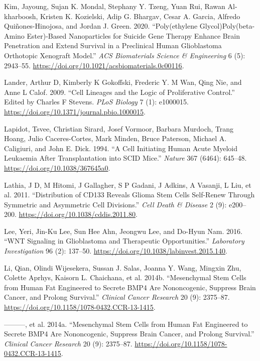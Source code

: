 \documentclass[
  letterpaper,
]{scrreprt}
\newlength{\cslhangindent}
\newenvironment{CSLReferences}[2] %
 {\begin{list}{}{%
  \setlength{\itemindent}{0pt}
  \setlength{\leftmargin}{0pt}
  \setlength{\parsep}{0pt}
  \ifodd #1
   \setlength{\leftmargin}{\cslhangindent}
   \setlength{\itemindent}{-1\cslhangindent}
  \fi
  \setlength{\itemsep}{#2\baselineskip}}}
 {\end{list}}
\theoremstyle{definition}
\theoremstyle{remark}
\begin{document}
\begin{CSLReferences}{1}{0}
Kim, Jayoung, Sujan K. Mondal, Stephany Y. Tzeng, Yuan Rui, Rawan
Al-kharboosh, Kristen K. Kozielski, Adip G. Bhargav, Cesar A. Garcia,
Alfredo Quiñones-Hinojosa, and Jordan J. Green. 2020. {``Poly(ethylene
Glycol){\textendash}Poly(beta-Amino Ester)-Based Nanoparticles for
Suicide Gene Therapy Enhance Brain Penetration and Extend Survival in a
Preclinical Human Glioblastoma Orthotopic Xenograft Model.''} \emph{ACS
Biomaterials Science \& Engineering} 6 (5): 2943--55.
\url{https://doi.org/10.1021/acsbiomaterials.0c00116}.

Lander, Arthur D, Kimberly K Gokoffski, Frederic Y. M Wan, Qing Nie, and
Anne L Calof. 2009. {``Cell Lineages and the Logic of Proliferative
Control.''} Edited by Charles F Stevens. \emph{PLoS Biology} 7 (1):
e1000015. \url{https://doi.org/10.1371/journal.pbio.1000015}.

Lapidot, Tsvee, Christian Sirard, Josef Vormoor, Barbara Murdoch, Trang
Hoang, Julio Caceres-Cortes, Mark Minden, Bruce Paterson, Michael A.
Caligiuri, and John E. Dick. 1994. {``A Cell Initiating Human Acute
Myeloid Leukaemia After Transplantation into SCID Mice.''} \emph{Nature}
367 (6464): 645--48. \url{https://doi.org/10.1038/367645a0}.

Lathia, J D, M Hitomi, J Gallagher, S P Gadani, J Adkins, A Vasanji, L
Liu, et al. 2011. {``Distribution of CD133 Reveals Glioma Stem Cells
Self-Renew Through Symmetric and Asymmetric Cell Divisions.''}
\emph{Cell Death \& Disease} 2 (9): e200--200.
\url{https://doi.org/10.1038/cddis.2011.80}.

Lee, Yeri, Jin-Ku Lee, Sun Hee Ahn, Jeongwu Lee, and Do-Hyun Nam. 2016.
{``WNT Signaling in Glioblastoma and Therapeutic Opportunities.''}
\emph{Laboratory Investigation} 96 (2): 137--50.
\url{https://doi.org/10.1038/labinvest.2015.140}.

Li, Qian, Olindi Wijesekera, Sussan J. Salas, Joanna Y. Wang, Mingxin
Zhu, Colette Aprhys, Kaisorn L. Chaichana, et al. 2014b. {``Mesenchymal
Stem Cells from Human Fat Engineered to Secrete BMP4 Are Nononcogenic,
Suppress Brain Cancer, and Prolong Survival.''} \emph{Clinical Cancer
Research} 20 (9): 2375--87.
\url{https://doi.org/10.1158/1078-0432.CCR-13-1415}.

---------, et al. 2014a. {``Mesenchymal Stem Cells from Human Fat
Engineered to Secrete BMP4 Are Nononcogenic, Suppress Brain Cancer, and
Prolong Survival.''} \emph{Clinical Cancer Research} 20 (9): 2375--87.
\url{https://doi.org/10.1158/1078-0432.CCR-13-1415}.


\end{CSLReferences}
\end{document}
